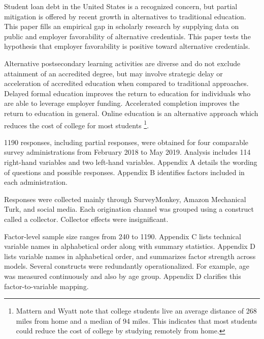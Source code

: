 \documentclass[review]{elsarticle}
\begin{document}
        Student loan debt in the United States is a recognized concern\cite{friedman2018student},
        but partial mitigation is offered by recent growth in alternatives to traditional education.
        This paper fills an empirical gap in scholarly research by supplying
        data on public and employer favorability of alternative credentials.
        This paper tests the hypothesis that employer favorability is positive toward alternative credentials.
        
        Alternative postsecondary learning activities are diverse and do not
        exclude attainment of an accredited degree, but may involve strategic
        delay or acceleration of accredited education when compared to traditional approaches.
        Delayed formal education improves the return to education for
        individuals who are able to leverage employer funding. Accelerated completion improves the return
        to education in general.
        Online education is an alternative approach which reduces the cost of college for most students
        \footnote{
            Mattern and Wyatt\cite{mattern2009student} note that college students live an average distance of
            268 miles from home and a median of 94 miles. This indicates that most students could reduce
            the cost of college by studying remotely from home.
        }.
        
        1190 responses, including partial responses, were obtained for four
        comparable survey administrations from February 2018 to May 2019.
        Analysis includes 114 right-hand variables and two left-hand variables.
        Appendix A details the wording of questions and possible responses.
        Appendix B identifies factors included in each administration.

        Responses were collected mainly through SurveyMonkey, Amazon Mechanical
        Turk, and social media. Each origination channel was grouped using a construct
        called a collector. Collector effects were insignificant.
        
        Factor-level sample size ranges from 240 to 1190. Appendix C lists
        technical variable names in alphabetical order along with summary
        statistics. Appendix D lists variable names in alphabetical order, and
        summarizes factor strength across models.
        Several constructs were redundantly
        operationalized. For example, age was measured
        continuously and also by age group. Appendix D clarifies this
        factor-to-variable mapping.
        
\end{document}

